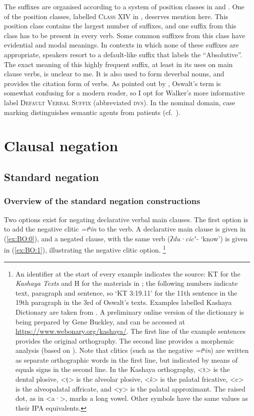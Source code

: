 \documentclass[output=paper,modfonts,nonflat,colorlinks,citecolor=brown]{langscibook}
\begin{document}
The suffixes are organised according to a system of position classes in \citet{Oswalt1961} and \citet{Buckley1994}. 
One of the position classes, labelled \textsc{Class XIV} in \citet{Oswalt1961}, deserves mention here. This position class contains the largest number of suffixes, and one suffix from this class has to be present in every verb. 
Some common suffixes from this class have evidential and modal meanings. In contexts in which none of these suffixes are appropriate, speakers resort to a default-like suffix that \citet{Oswalt1961} labels the ``Absolutive''. 
The exact meaning of this highly frequent suffix, at least in its uses on main clause verbs, is unclear to me. It is also used to form deverbal nouns, and provides the citation form of verbs. As pointed out by \citet{Walker2016}, Oswalt's term is somewhat confusing for a modern reader, so I opt for Walker's more informative label \textsc{Default Verbal Suffix} (abbreviated \textsc{dvs}).
In the nominal domain, case marking distinguishes semantic agents from patients (cf.\ ). 
    
    
\section{Clausal negation}

\subsection{Standard negation}\label{sec:BO:standard}
\subsubsection{Overview of the standard negation constructions}
Two options exist for negating declarative verbal main clauses. The first option is to add the negative clitic \textit{=tʰin} to the verb. A declarative main clause is given in (\ref{ex:BO:0}), 
and a negated clause, with the same verb (\textit{ʔdu·cicʼ-} `know') is given in (\ref{ex:BO:1}), illustrating the negative clitic option.%
\footnote{%
An identifier at the start of every example indicates the source: KT for the \textit{Kashaya Texts} \citep{Oswalt1964} and H for the materials in \citet{Halpern1940}; the following numbers indicate text, paragraph and sentence, so `KT 3:19.11' for the 11th sentence in the 19th paragraph in the 3rd of Oswalt's texts. Examples labelled Kashaya Dictionary are taken from \citet{Oswalt}. A preliminary online version of the dictionary is being prepared by Gene Buckley, and can be accessed at \url{https://www.webonary.org/kashaya/}. The first line of the example sentences provides the original orthography. The second line provides a morphemic analysis (based on \citealt{Buckley2019}). Note that clitics (such as the negative \textit{=tʰin}) are written as separate orthographic words in the first line, but indicated by means of equals signs in the second line.
In the Kashaya orthography, <t> is the dental plosive, <ṭ> is the alveolar plosive, <š> is the palatal fricative, <c> is the alveopalatal affricate, and <y> is the palatal approximant. The raised dot, as in <a·>, marks a long vowel. Other symbols have the same values as their IPA equivalents.
} 
\end{document}
